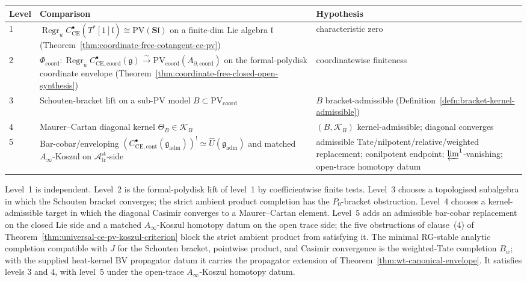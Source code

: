 \documentclass[11pt]{memoir}
\begin{document}
\begin{center}
\renewcommand{\arraystretch}{1.3}
\begin{tabular}{@{}p{}p{}p{}@{}}
\hline
\textbf{Level} & \textbf{Comparison} & \textbf{Hypothesis}\\
\hline
1 &
\(\operatorname{Regr}_u
C^\bullet_{\mathrm{CE}}(T^*[1]\mathfrak l)\cong
\mathrm{PV}(\mathbf S\mathfrak l)\) on a finite-dim Lie algebra
\(\mathfrak l\)
(Theorem~\ref{thm:coordinate-free-cotangent-ce-pv}) &
characteristic zero\\
\hline
2 &
\(\Phi_{\mathrm{coord}}\colon
\operatorname{Regr}_u
C^\bullet_{\mathrm{CE},\mathrm{coord}}(\mathfrak g)
\xrightarrow{\sim}
\mathrm{PV}_{\mathrm{coord}}(A_{\partial,\mathrm{coord}})\) on
the formal-polydisk coordinate envelope
(Theorem~\ref{thm:coordinate-free-closed-open-synthesis}) &
coordinatewise finiteness\\
\hline
3 &
Schouten-bracket lift on a sub-PV model
\(B\subset\mathrm{PV}_{\mathrm{coord}}\) &
\(B\) bracket-admissible
(Definition~\ref{defn:bracket-kernel-admissible})\\
\hline
4 &
Maurer--Cartan diagonal kernel
\(\Theta_B\in\mathcal K_B\) &
\((B,\mathcal K_B)\) kernel-admissible; diagonal converges\\
\hline
5 &
Bar-cobar/enveloping
\((C^\bullet_{\mathrm{CE},\mathrm{cont}}(\mathfrak g_{\mathrm{adm}}))^!
\simeq\widehat U(\mathfrak g_{\mathrm{adm}})\) and matched
\(A_\infty\)-Koszul on \(\mathcal A_{\mathrm{tr}}^{\mathrm{st}}\)-side &
admissible Tate/nilpotent/relative/weighted replacement;
conilpotent endpoint; \(\varprojlim^1\)-vanishing; open-trace
homotopy datum\\
\hline
\end{tabular}
\end{center}

Level~1 is independent.  Level~2 is the formal-polydisk lift of
level~1 by coefficientwise finite tests.  Level~3 chooses a
topologised subalgebra in which the Schouten bracket converges; the
  strict ambient product completion has the \(P_0\)-bracket obstruction.
  Level~4 chooses a kernel-admissible target in which
the diagonal Casimir converges to a Maurer--Cartan element.  Level~5
adds an admissible bar-cobar replacement on the closed Lie side and a
matched \(A_\infty\)-Koszul homotopy datum on the open trace side;
the five obstructions of clause~(4) of
Theorem~\ref{thm:universal-ce-pv-koszul-criterion} block the strict
ambient product from satisfying it.  The minimal RG-stable analytic
completion compatible with \(J\) for the Schouten bracket, pointwise product,
and Casimir convergence is the weighted-Tate completion \(B_w\); with
the supplied heat-kernel BV propagator datum it carries the propagator
extension of Theorem~\ref{thm:wt-canonical-envelope}.  It satisfies
levels 3 and 4, with level~5 under the open-trace
\(A_\infty\)-Koszul homotopy datum.
\end{document}
